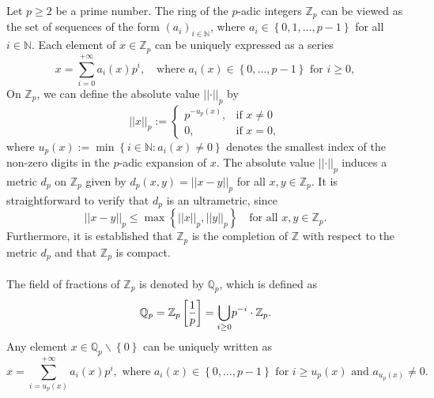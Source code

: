 \documentclass[a4paper, 12pt]{article}
\theoremstyle{definition}
\begin{document}
	Let $p \ge 2$ be a prime number. The ring of the $p$-adic integers $\mathbb{Z}_{p}$ can be viewed as the set of sequences of the form $  \left(  a_{i}   \right)_{ i \in \mathbb{N} }$, where  $a_{i} \in  \left\{  0, 1, \dots, p-1  \right\} $ for all $i \in  \mathbb{N} $. 
	Each element of $ x \in \mathbb{Z}_{p}$ can be uniquely expressed as a series 
	\begin{equation}\label{Eq2_p-adic Integers}
		x = \sum_{i= 0}^{+ \infty }  a_{i}(x) p^{i}, \quad  \text{where }  a_{i}(x) \in  \left\{  0, \dots, p-1  \right\}    \text{ for } i \ge 0, 
	\end{equation}
	On $\mathbb{Z}_{p}$, we can define the absolute value $ \left| \left|  \cdot  \right|  \right|_{p}$ by
	\begin{equation*}
		\left| \left|  x  \right|  \right|_{p} :=   \begin{cases} 
			p^{-u_{p}(x)}, & \text{if }  x  \neq 0 \\ 
			0, & \text{if } x =0 ,
		\end{cases} 
	\end{equation*}
	where $u_{p} \left(  x  \right) :=  \min \left\{  i \in  \mathbb{N} :     a_{i} \left(  x  \right)   \neq 0  \right\} $ denotes the smallest index of the non-zero digits in the $p$-adic expansion of $x$. 
	The absolute value $ \left| \left|  \cdot  \right|  \right|_{p}$ induces a metric $d_{p}$ on $\mathbb{Z}_{p}$ given by $d_{p}(x,y) =  \left| \left|  x -y  \right|  \right|_{p}$ for all $x,y \in \mathbb{Z}_{p}$. It is straightforward to verify that $d_{p}$ is an ultrametric, since 
	\begin{equation}\label{Eq2_p-adic Norm Triangle Inequality}
		\left| \left|  x -y  \right|  \right|_{p}   \le   \max \left\{   \left| \left|  x  \right|  \right|_{p},  \left| \left|  y  \right|  \right|_{p}  \right\}  \quad \text{for all } x,y \in \mathbb{Z}_{p} .    
	\end{equation}
	Furthermore, it is established that $\mathbb{Z}_{p}$ is the completion of $\mathbb{Z} $ with respect to the metric $d_{p}$ and that $\mathbb{Z}_{p}$ is compact.
	
	
	\paragraph{}
	The field of fractions of $\mathbb{Z}_{p}$ is denoted by $\mathbb{Q}_{p}$, which is defined as  
	$$ \mathbb{Q}_{p}    =    \mathbb{Z}_{p} \left[  {1 \over p} \right]    =    \underset{i \ge 0}{\bigcup} p^{-i} \cdot \mathbb{Z}_{p} .$$
	Any element $x \in \mathbb{Q}_{p}\backslash  \left\{  0  \right\} $ can be uniquely written as 
	\begin{equation*}\label{Eq2_p-adic Numbers}
		x  =  \sum_{i = u_{p} \left(  x  \right)  }^{+ \infty }  a_{i}(x) p^{i},   \text{ where } a_{i}(x) \in  \left\{  0, \dots, p-1  \right\}  \text{ for } i \ge u_{p} \left(  x  \right)  \text{ and } a_{u_{p} \left(  x  \right)  }  \neq 0. 
	\end{equation*}
	
\end{document}
